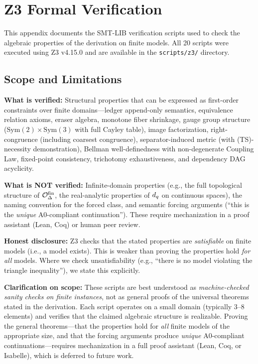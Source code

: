 \section{Z3 Formal Verification}
\label{app:z3}

This appendix documents the SMT-LIB verification scripts used to check
the algebraic properties of the derivation on finite models.  All 20
scripts were executed using Z3 \citep{demoura2008} v4.15.0 and are
available in the \texttt{scripts/z3/} directory.

\subsection{Scope and Limitations}

\textbf{What is verified:} Structural properties that can be expressed as
first-order constraints over finite domains---ledger append-only semantics,
equivalence relation axioms, eraser algebra, monotone fiber shrinkage,
gauge group structure ($\mathrm{Sym}(2) \times \mathrm{Sym}(3)$ with full
Cayley table), image factorization, right-congruence (including coarsest
congruence), separator-induced metric (with (TS)-necessity demonstration),
Bellman well-definedness with non-degenerate Coupling Law, fixed-point
consistency, trichotomy exhaustiveness, and dependency DAG acyclicity.

\textbf{What is NOT verified:} Infinite-domain properties (e.g., the full
topological structure of $\mathcal{O}^{\mathrm{fin}}_\Delta$, the real-analytic properties of
$d_q$ on continuous spaces), the naming convention for the forced class, and semantic forcing arguments (``this is the \emph{unique}
A0-compliant continuation'').  These require mechanization in a proof
assistant (Lean, Coq) or human peer review.

\textbf{Honest disclosure:} Z3 checks that the stated properties are
\emph{satisfiable} on finite models (i.e., a model exists).  This is
weaker than proving the properties hold \emph{for all} models.  Where
we check unsatisfiability (e.g., ``there is no model violating the
triangle inequality''), we state this explicitly.

\textbf{Clarification on scope:} These scripts are best understood as
\emph{machine-checked sanity checks on finite instances}, not as
general proofs of the universal theorems stated in the derivation.  Each
script operates on a small domain (typically 3--8 elements) and verifies
that the claimed algebraic structure is realizable.  Proving the general
theorems---that the properties hold for \emph{all} finite models of the
appropriate size, and that the forcing arguments produce \emph{unique}
A0-compliant continuations---requires mechanization in a full proof
assistant (Lean, Coq, or Isabelle), which is deferred to future work.

